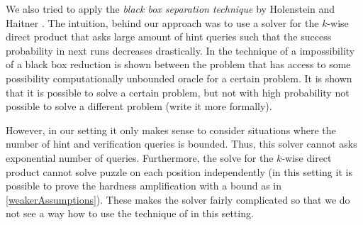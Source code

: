 We also tried to apply the \textit{black box separation technique} by Holenstein and Haitner \cite{haitner2009possibility}.
The intuition, behind our approach was to use a solver for the $k$-wise direct product that asks large amount of hint queries such that
the success probability in next runs decreases drastically.
In the technique of \cite{haitner2009possibility} a impossibility of a black box reduction is shown between the problem that has access
to some possibility computationally unbounded oracle for a certain problem. It is shown that it is possible to solve a certain problem,
but not with high probability not possible to solve a different problem (write it more formally).

However, in our setting it only makes sense to consider situations where the number of hint and verification queries is bounded.
Thus, this solver cannot asks exponential number of queries. Furthermore, the solve for the $k$-wise direct product cannot solve puzzle on each position
independently (in this setting it is possible to prove the hardness amplification with a bound as in \ref{weakerAssumptions}).
These makes the solver fairly complicated so that we do not see a way how to use the technique of \cite{haitner2009possibility} in this setting.


%
%
